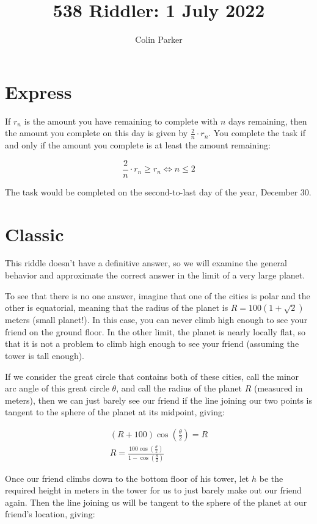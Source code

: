 \documentclass[11pt]{article} %
\title{538 Riddler: 1 July 2022}
\author{Colin Parker}
\begin{document}
\maketitle

\section{Express}

If $r_n$ is the amount you have remaining to complete with $n$ days remaining, then the amount you complete on this day
is given by $\frac{2}{n} \cdot r_n$. You complete the task if and only if the amount you complete is at least
the amount remaining:

$$\frac{2}{n} \cdot r_n \geq r_n \iff n \leq 2$$

The task would be completed on the second-to-last day of the year, December 30.

\section{Classic}

This riddle doesn't have a definitive answer, so we will examine the general behavior and approximate the
correct answer in the limit of a very large planet.

To see that there is no one answer, imagine that one of the cities
is polar and the other is equatorial, meaning that the radius of the planet is $R = 100(1 + \sqrt2)$ meters (small planet!).
In this case, you
can never climb high enough to see your friend on the ground floor. In the other limit, the planet is nearly locally flat,
so that it is not a problem to climb high enough to see your friend (assuming the tower is tall enough).

If we consider the great circle that contains both of these cities, call the minor arc angle of this great circle $\theta$,
and call the radius of the planet $R$ (measured in meters), then we can just barely see our friend if the line joining our
two points is tangent to the sphere of the planet at its midpoint, giving:

\begin{align*}
(R + 100)\cos \left(\frac{\theta}{2}\right) = R \\
R = \frac{100\cos \left(\frac{\theta}{2}\right)}{1 - \cos \left(\frac{\theta}{2}\right)}
\end{align*}

Once our friend climbs down to the bottom floor of his tower, let $h$ be the required height in meters in the tower for us to
just barely make out our friend again. Then the line joining us will be tangent to the sphere of the planet at our
friend's location, giving:
\end{document}
